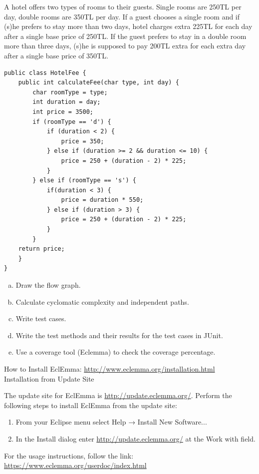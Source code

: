\begin{exercise}
    A hotel offers two types of rooms to their guests. Single rooms are 250TL per day, double rooms are 350TL per day. If a guest chooses a single room and if (s)he prefers to stay more than two days, hotel charges extra 225TL for each day after a single base price of 250TL. If the guest prefers to stay in a double room more than three days, (s)he is supposed to pay 200TL extra for each extra day after a single base price of 350TL.

    \begin{lstlisting}
public class HotelFee {
    public int calculateFee(char type, int day) {
        char roomType = type; 
        int duration = day;
        int price = 3500;
        if (roomType == 'd') {     
            if (duration < 2) {
                price = 350;
            } else if (duration >= 2 && duration <= 10) {
                price = 250 + (duration - 2) * 225;
            }
        } else if (roomType == 's') {
            if(duration < 3) {
                price = duration * 550;
            } else if (duration > 3) {
                price = 250 + (duration - 2) * 225;
            } 
        } 
    return price;
    }
}
    \end{lstlisting}
    
    \begin{enumerate}[a),noitemsep]
        \item Draw the flow graph.
        \item Calculate cyclomatic complexity and independent paths.
        \item Write test cases.
        \item Write the test methods and their results for the test cases in JUnit.
        \item Use a coverage tool (Eclemma) to check the coverage percentage.
    \end{enumerate}
    
    How to Install EclEmma: \url{http://www.eclemma.org/installation.html}\\
    Installation from Update Site

    The update site for EclEmma is \url{http://update.eclemma.org/}. Perform the following steps to install EclEmma from the update site:

    \begin{enumerate}
        \item From your Eclipse menu select Help → Install New Software...
        \item In the Install dialog enter \url{http://update.eclemma.org/} at the Work with field.
    \end{enumerate}
    
    For the usage instructions, follow the link: \url{https://www.eclemma.org/userdoc/index.html}
\end{exercise}

